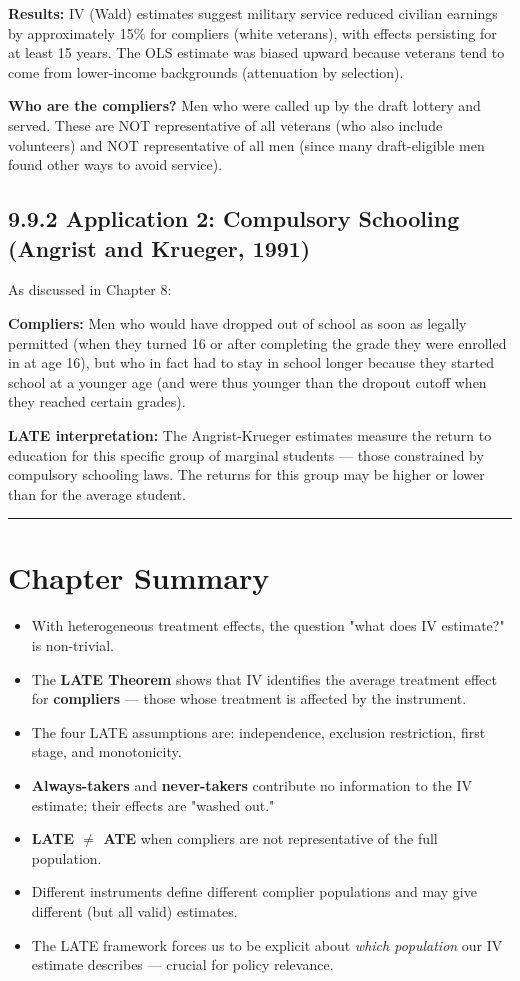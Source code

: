 \textbf{Results:} IV (Wald) estimates suggest military service reduced civilian earnings by approximately 15\% for compliers (white veterans), with effects persisting for at least 15 years. The OLS estimate was biased upward because veterans tend to come from lower-income backgrounds (attenuation by selection).

\textbf{Who are the compliers?} Men who were called up by the draft lottery and served. These are NOT representative of all veterans (who also include volunteers) and NOT representative of all men (since many draft-eligible men found other ways to avoid service).

\subsection{9.9.2 Application 2: Compulsory Schooling (Angrist and Krueger, 1991)}

As discussed in Chapter 8:

\textbf{Compliers:} Men who would have dropped out of school as soon as legally permitted (when they turned 16 or after completing the grade they were enrolled in at age 16), but who in fact had to stay in school longer because they started school at a younger age (and were thus younger than the dropout cutoff when they reached certain grades).

\textbf{LATE interpretation:} The Angrist-Krueger estimates measure the return to education for this specific group of marginal students --- those constrained by compulsory schooling laws. The returns for this group may be higher or lower than for the average student.

\medskip\hrule\medskip

\section{Chapter Summary}

\begin{itemize}
\item With heterogeneous treatment effects, the question "what does IV estimate?" is non-trivial.
\item The \textbf{LATE Theorem} shows that IV identifies the average treatment effect for \textbf{compliers} --- those whose treatment is affected by the instrument.
\item The four LATE assumptions are: independence, exclusion restriction, first stage, and monotonicity.
\item \textbf{Always-takers} and \textbf{never-takers} contribute no information to the IV estimate; their effects are "washed out."
\item \textbf{LATE $\neq$ ATE} when compliers are not representative of the full population.
\item Different instruments define different complier populations and may give different (but all valid) estimates.
\item The LATE framework forces us to be explicit about \textit{which population} our IV estimate describes --- crucial for policy relevance.
\end{itemize}

